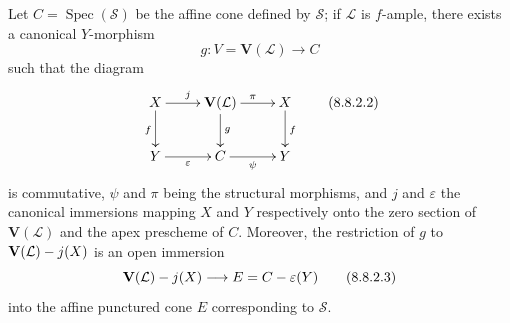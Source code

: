 \begin{proposition}[8.8.2]
\label{II.8.8.2}
Let $C=\operatorname{Spec}(\mathcal{S})$ be the affine cone defined by
$\mathcal{S}$; if $\mathcal{L}$ is $f$-ample, there exists a canonical
$Y$-morphism
\begin{equation}
\label{II.8.8.2.1}
  g:V=\mathbf{V}(\mathcal{L})\longrightarrow C
\tag{8.8.2.1}
\end{equation}
such that the diagram
\begin{equation}
\label{II.8.8.2.2}
  \xymatrix{
    X\ar[r]^{j}\ar[d]_{f} &
    \mathbf{V}(\mathcal{L})\ar[r]^{\pi}\ar[d]^{g} & X\ar[d]^{f}\\
    Y\ar[r]_{\varepsilon} & C\ar[r]_{\psi} & Y
  }
\tag{8.8.2.2}
\end{equation}
is commutative, $\psi$ and $\pi$ being the structural morphisms, and $j$ and
$\varepsilon$ the canonical immersions mapping $X$ and $Y$ respectively onto
the zero section of $\mathbf{V}(\mathcal{L})$ and the apex prescheme
of $C$. Moreover, the restriction of $g$ to
$\mathbf{V}(\mathcal{L})- j(X)$ is an open immersion
\begin{equation}
\label{II.8.8.2.3}
  \mathbf{V}(\mathcal{L})- j(X)\longrightarrow
  E=C-\varepsilon(Y)
\tag{8.8.2.3}
\end{equation}
into the affine punctured cone $E$ corresponding to $\mathcal{S}$.
\end{proposition}

